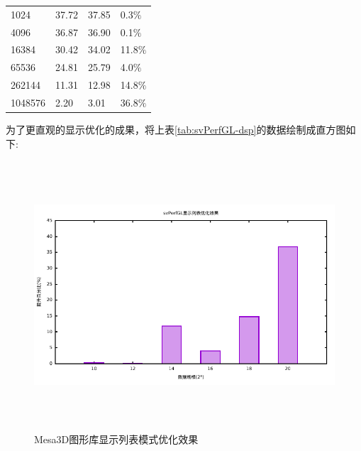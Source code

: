 \begin{center}  
\tablelasttail{\bottomrule}

\begin{supertabular}{p{4.cm}<{\centering}p{4.cm}<{\centering}p{4.cm}<{\centering}p{3.cm}<{\centering}}
	1024& 37.72& 37.85&	0.3$\%$	\\
	4096& 36.87& 36.90&	0.1$\%$	\\
	16384& 30.42& 34.02& 11.8$\%$	\\
	65536& 24.81& 25.79& 4.0$\%$	\\
	262144& 11.31& 12.98& 14.8$\%$	\\
    1048576& 2.20& 3.01& 36.8$\%$	\\
\end{supertabular}
\end{center}

为了更直观的显示优化的成果，将上表\ref{tab:svPerfGL-dsp}的数据绘制成直方图如下:

\begin{figure}[H] 
  \centering
  \includegraphics[width=14cm,height=10cm]{figures/gnuplot/result/dsp.eps}
  \caption{Mesa3D图形库显示列表模式优化效果}
  \label{fig:svPerfGL-dsp}
\end{figure}


